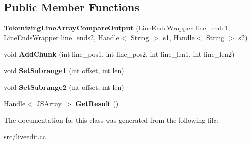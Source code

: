 \subsection*{Public Member Functions}
\begin{DoxyCompactItemize}
\item 
\hypertarget{classv8_1_1internal_1_1_tokenizing_line_array_compare_output_a0ba6126f42b89719f5a984a2126f34a4}{}{\bfseries Tokenizing\+Line\+Array\+Compare\+Output} (\hyperlink{classv8_1_1internal_1_1_line_ends_wrapper}{Line\+Ends\+Wrapper} line\+\_\+ends1, \hyperlink{classv8_1_1internal_1_1_line_ends_wrapper}{Line\+Ends\+Wrapper} line\+\_\+ends2, \hyperlink{classv8_1_1internal_1_1_handle}{Handle}$<$ \hyperlink{classv8_1_1internal_1_1_string}{String} $>$ s1, \hyperlink{classv8_1_1internal_1_1_handle}{Handle}$<$ \hyperlink{classv8_1_1internal_1_1_string}{String} $>$ s2)\label{classv8_1_1internal_1_1_tokenizing_line_array_compare_output_a0ba6126f42b89719f5a984a2126f34a4}

\item 
\hypertarget{classv8_1_1internal_1_1_tokenizing_line_array_compare_output_a1bad0d39f46413fdbff46933567cddff}{}void {\bfseries Add\+Chunk} (int line\+\_\+pos1, int line\+\_\+pos2, int line\+\_\+len1, int line\+\_\+len2)\label{classv8_1_1internal_1_1_tokenizing_line_array_compare_output_a1bad0d39f46413fdbff46933567cddff}

\item 
\hypertarget{classv8_1_1internal_1_1_tokenizing_line_array_compare_output_a6f547f4407c739e284bc2777653e1f73}{}void {\bfseries Set\+Subrange1} (int offset, int len)\label{classv8_1_1internal_1_1_tokenizing_line_array_compare_output_a6f547f4407c739e284bc2777653e1f73}

\item 
\hypertarget{classv8_1_1internal_1_1_tokenizing_line_array_compare_output_ad95c4664f6b21b334bc46751118ef8d8}{}void {\bfseries Set\+Subrange2} (int offset, int len)\label{classv8_1_1internal_1_1_tokenizing_line_array_compare_output_ad95c4664f6b21b334bc46751118ef8d8}

\item 
\hypertarget{classv8_1_1internal_1_1_tokenizing_line_array_compare_output_aaea7e407c1e0de9e799cd569819b67f5}{}\hyperlink{classv8_1_1internal_1_1_handle}{Handle}$<$ \hyperlink{classv8_1_1internal_1_1_j_s_array}{J\+S\+Array} $>$ {\bfseries Get\+Result} ()\label{classv8_1_1internal_1_1_tokenizing_line_array_compare_output_aaea7e407c1e0de9e799cd569819b67f5}

\end{DoxyCompactItemize}


The documentation for this class was generated from the following file\+:\begin{DoxyCompactItemize}
\item 
src/liveedit.\+cc\end{DoxyCompactItemize}
